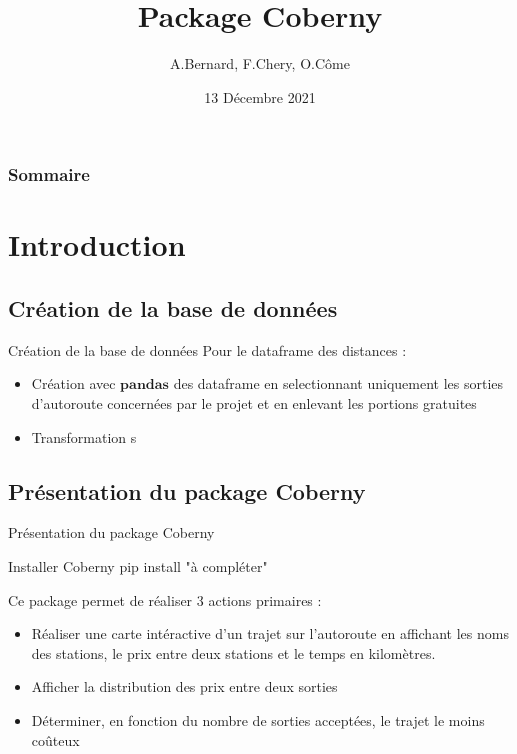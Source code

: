 \documentclass{beamer}
\title{Package Coberny}
\author{A.Bernard, F.Chery, O.Côme}\institute{Faculté des sciences de Montpellier}
\date{13 Décembre 2021}
\begin{document}
\begin{frame}
\titlepage
\end{frame}

\begin{frame}
  \frametitle{Sommaire}
  \tableofcontents
\end{frame}

\section{Introduction}
\subsection{Création de la base de données}

\begin{frame}[fragile]{Création de la base de données}
Pour le dataframe des distances : \newline
\begin{itemize}
\item Création avec $\textbf{pandas}$ des dataframe en selectionnant uniquement les sorties d'autoroute concernées par le projet et en enlevant les portions gratuites
\item Transformation s
\end{itemize}
\end{frame}


\subsection{Présentation du package Coberny}

\begin{frame}[fragile]{Présentation du package Coberny}
\begin{block}{Installer Coberny}
pip install "à compléter"
\end{block}
Ce package permet de réaliser 3 actions primaires : \newline
\begin{itemize}
\item Réaliser une carte intéractive d'un trajet sur l'autoroute en affichant les noms des stations, le prix entre deux stations et le temps en kilomètres.
\item Afficher la distribution des prix entre deux sorties
\item Déterminer, en fonction du nombre de sorties acceptées, le trajet le moins coûteux
\end{itemize}
\end{frame}
\end{document}
